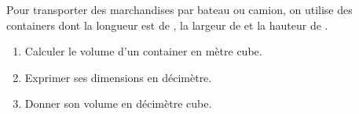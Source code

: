 \begin{exercice}
   Pour transporter des marchandises par bateau ou camion, on utilise des containers dont la longueur est de , la largeur de  et la hauteur de .
   \begin{enumerate}
       \item Calculer le volume d'un container en mètre cube.
       \item Exprimer ses dimensions en décimètre.
       \item Donner son volume en décimètre cube.
   \end{enumerate}
\end{exercice}

